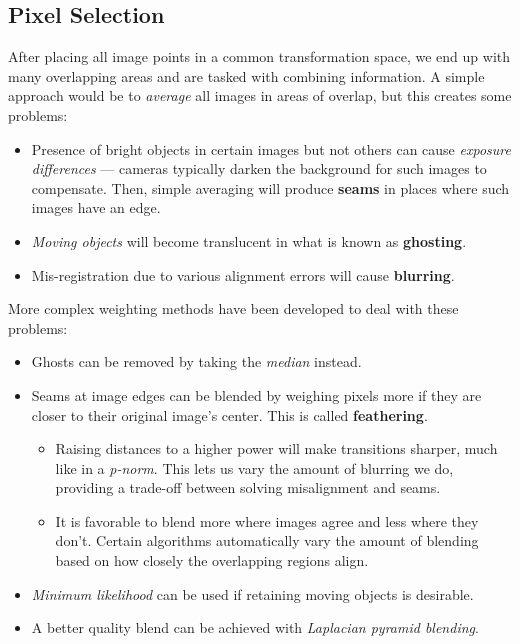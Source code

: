\documentclass{article}
\begin{document}
\subsection{Pixel Selection}
After placing all image points in a common transformation space, we end up with many overlapping areas and are tasked with combining information.
A simple approach would be to \textit{average} all images in areas of overlap, but this creates some problems:
\begin{itemize}
    \itemsep -0.15em
    \item Presence of bright objects in certain images but not others can cause \textit{exposure differences} — cameras typically darken the background for such images to compensate.
    Then, simple averaging will produce \textbf{seams} in places where such images have an edge.
    \item \textit{Moving objects} will become translucent in what is known as \textbf{ghosting}.
    \item Mis-registration due to various alignment errors will cause \textbf{blurring}.
\end{itemize}
More complex weighting methods have been developed to deal with these problems:
\begin{itemize}
    \itemsep -0.15em
    \item Ghosts can be removed by taking the \textit{median} instead.
    \item Seams at image edges can be blended by weighing pixels more if they are closer to their original image's center.
    This is called \textbf{feathering}.
    \begin{itemize}
        \itemsep -0.15em
        \item Raising distances to a higher power will make transitions sharper, much like in a \textit{p-norm}.
        This lets us vary the amount of blurring we do, providing a trade-off between solving misalignment and seams.
        \item It is favorable to blend more where images agree and less where they don't.
        Certain algorithms automatically vary the amount of blending based on how closely the overlapping regions align.
    \end{itemize}
    \item \textit{Minimum likelihood} can be used if retaining moving objects is desirable.
    \item A better quality blend can be achieved with \textit{Laplacian pyramid blending}.
\end{itemize}
\end{document}
